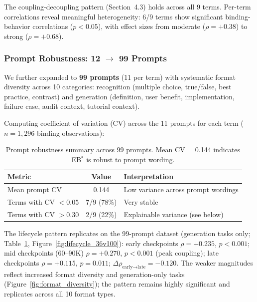 \documentclass[10pt]{article} %
\begin{document}
The coupling-decoupling pattern (Section~4.3) holds across all 9 terms.
Per-term correlations reveal meaningful heterogeneity: 6/9 terms show significant binding-behavior correlations ($p<0.05$), with effect sizes from moderate ($\rho=+0.38$) to strong ($\rho=+0.68$).

\subsubsection{Prompt Robustness: 12 $\to$ 99 Prompts}

We further expanded to \textbf{99 prompts} (11 per term) with systematic format diversity across 10 categories: recognition (multiple choice, true/false, best practice, contrast) and generation (definition, user benefit, implementation, failure case, audit context, tutorial context).

Computing coefficient of variation (CV) across the 11 prompts for each term ($n=1{,}296$ binding observations):

\begin{table}[h]
\centering
\small
\begin{tabular}{|l|c|l|}
\hline
\textbf{Metric} & \textbf{Value} & \textbf{Interpretation} \\
\hline
Mean prompt CV & 0.144 & Low variance across prompt wordings \\
Terms with CV $<0.05$ & 7/9 (78\%) & Very stable \\
Terms with CV $>0.30$ & 2/9 (22\%) & Explainable variance (see below) \\
\hline
\end{tabular}
\caption{Prompt robustness summary across 99 prompts. Mean CV = 0.144 indicates EB$^*$ is robust to prompt wording.}
\label{tab:prompt_robustness}
\end{table}

The lifecycle pattern replicates on the 99-prompt dataset (generation tasks only; Table~\ref{tab:prompt_robustness}, Figure~\ref{fig:lifecycle_36v100}):
early checkpoints $\rho=+0.235$, $p<0.001$; mid checkpoints (60--90K) $\rho=+0.270$, $p<0.001$ (peak coupling); late checkpoints $\rho=+0.115$, $p=0.011$; $\Delta\rho_{\text{early}\to\text{late}}=-0.120$.
The weaker magnitudes reflect increased format diversity and generation-only tasks (Figure~\ref{fig:format_diversity}); the pattern remains highly significant and replicates across all 10 format types.
\end{document}
